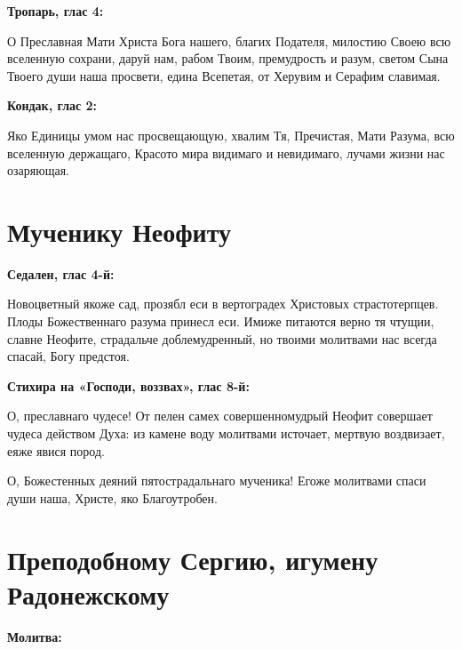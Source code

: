 \bfseries Тропарь, глас 4:\normalfont{}

О Преславная Мати Христа Бога нашего, благих Подателя, милостию Своею всю вселенную сохрани, даруй нам, рабом Твоим, премудрость и разум, светом Сына Твоего души наша просвети, едина Всепетая, от Херувим и Серафим славимая.


\bfseries Кондак, глас 2:\normalfont{}

Яко Единицы умом нас просвещающую, хвалим Тя, Пречистая, Мати Разума, всю вселенную держащаго, Красото мира видимаго и невидимаго, лучами жизни нас озаряющая.


\section{Мученику Неофиту}
 
\bfseries Седален, глас 4-й:\normalfont{}


Новоцветный якоже сад, прозябл еси в вертоградех Христовых страстотерпцев. Плоды Божественнаго разума принесл еси. Имиже питаются верно тя чтущии, славне Неофите, страдальче доблемудренный, но твоими молитвами нас всегда спасай, Богу предстоя.


\medskip
\bfseries Стихира на «Господи, воззвах», глас 8-й:\normalfont{}


О, преславнаго чудесе! От пелен самех совершенномудрый Неофит совершает чудеса действом Духа: из камене воду молитвами источает, мертвую воздвизает, еяже явися пород.

О, Божестенных деяний пятострадальнаго мученика! Егоже молитвами спаси души наша, Христе, яко Благоутробен.

\section{Преподобному Сергию, игумену Радонежскому}
 
\bfseries Молитва:\normalfont{}


